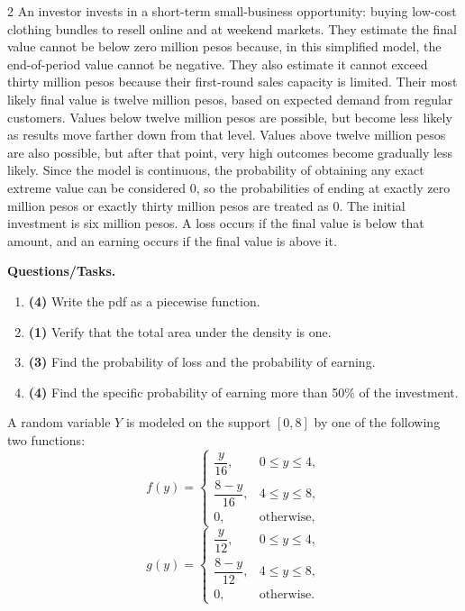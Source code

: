 \begin{multicols}{2}
		\vspace{-0.3cm}
		An investor invests in a short-term small-business opportunity: buying low-cost clothing bundles to resell online and at weekend markets. They estimate the final value cannot be below zero million pesos because, in this simplified model, the end-of-period value cannot be negative. They also estimate it cannot exceed thirty million pesos because their first-round sales capacity is limited. Their most likely final value is twelve million pesos, based on expected demand from regular customers. Values below twelve million pesos are possible, but become less likely as results move farther down from that level. Values above twelve million pesos are also possible, but after that point, very high outcomes become gradually less likely. Since the model is continuous, the probability of obtaining any exact extreme value can be considered $0$, so the probabilities of ending at exactly zero million pesos or exactly thirty million pesos are treated as $0$. The initial investment is six million pesos. A loss occurs if the final value is below that amount, and an earning occurs if the final value is above it.
		
		\textbf{Questions/Tasks.}
		\begin{enumerate}[label=\textbf{\alph*)}]
			\item \textbf{(4)} Write the pdf as a piecewise function.
			\item \textbf{(1)} Verify that the total area under the density is one.
			\item \textbf{(3)} Find the probability of loss and the probability of earning.
			\item \textbf{(4)} Find the specific probability of earning more than 50\% of the investment.
		\end{enumerate}
		
		\vspace{4.55cm}
		\vspace{-0.3cm}
		A random variable $Y$ is modeled on the support $[0,8]$ by one of the following two functions:
		\[
		f(y)=\begin{cases}
			\dfrac{y}{16}, & 0\le y\le 4,\\
			\dfrac{8-y}{16}, & 4\le y\le 8,\\
			0, & \text{otherwise,}
		\end{cases}
		\]
		\[
		g(y)=\begin{cases}
			\dfrac{y}{12}, & 0\le y\le 4,\\
			\dfrac{8-y}{12}, & 4\le y\le 8,\\
			0, & \text{otherwise.}
		\end{cases}
		\]
		

\end{multicols}
